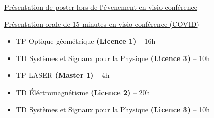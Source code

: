 \documentclass[9pt,a4paper,academicons]{altacv}
\begin{document}
\begin{fullwidth}
\medskip

\href{https://hal.science/hal-
	04133619}{Présentation de poster lors de l'évenement en visio-conférence}

\newpage


    
{}

\smallskip

\href{https://www.youtube.com/watch?v=NiCSm7F7ba8}{Présentation orale de 15 minutes en visio-conférence (COVID)}





 



  \begin{itemize}
    \item TP Optique géométrique \textbf{(Licence 1)} -- 16h
    \item TD Systèmes et Signaux pour la Physique \textbf{(Licence 3)} -- 10h

  \end{itemize}

  \divider


  \begin{itemize}
    \item TP LASER \textbf{(Master 1)} -- 4h
    \item TD \'Eléctromagnétisme \textbf{(Licence 2)} -- 20h
    \item TD Systèmes et Signaux pour la Physique \textbf{(Licence 3)} -- 10h

  \end{itemize}
  \divider
  
\end{fullwidth}
\end{document}
